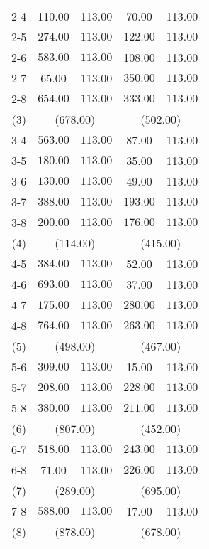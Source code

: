 \begin{table}[ht]
\begin{tabular*}{\textwidth}{@{\extracolsep{\fill} }ccccc}
  2-4 & 110.00 & 113.00 & 70.00 & 113.00 \\ 
  2-5 & \(\mathbf{274.00}\) & \(\mathbf{113.00}\) & \(\mathbf{122.00}\) & \(\mathbf{113.00}\) \\ 
  2-6 & \(\mathbf{583.00}\) & \(\mathbf{113.00}\) & 108.00 & 113.00 \\ 
  2-7 & 65.00 & 113.00 & \(\mathbf{350.00}\) & \(\mathbf{113.00}\) \\ 
  2-8 & \(\mathbf{654.00}\) & \(\mathbf{113.00}\) & \(\mathbf{333.00}\) & \(\mathbf{113.00}\) \\ 
   [1ex]
(3) & \multicolumn{2}{c}{(678.00)} & \multicolumn{2}{c}{(502.00)} \\   
   3-4 & \(\mathbf{563.00}\) & \(\mathbf{113.00}\) & 87.00 & 113.00 \\ 
  3-5 & \(\mathbf{180.00}\) & \(\mathbf{113.00}\) & 35.00 & 113.00 \\ 
  3-6 & \(\mathbf{130.00}\) & \(\mathbf{113.00}\) & 49.00 & 113.00 \\ 
  3-7 & \(\mathbf{388.00}\) & \(\mathbf{113.00}\) & \(\mathbf{193.00}\) & \(\mathbf{113.00}\) \\ 
  3-8 & \(\mathbf{200.00}\) & \(\mathbf{113.00}\) & \(\mathbf{176.00}\) & \(\mathbf{113.00}\) \\ 
   [1ex]
(4) & \multicolumn{2}{c}{(114.00)} & \multicolumn{2}{c}{(415.00)} \\   
   4-5 & \(\mathbf{384.00}\) & \(\mathbf{113.00}\) & 52.00 & 113.00 \\ 
  4-6 & \(\mathbf{693.00}\) & \(\mathbf{113.00}\) & 37.00 & 113.00 \\ 
  4-7 & \(\mathbf{175.00}\) & \(\mathbf{113.00}\) & \(\mathbf{280.00}\) & \(\mathbf{113.00}\) \\ 
  4-8 & \(\mathbf{764.00}\) & \(\mathbf{113.00}\) & \(\mathbf{263.00}\) & \(\mathbf{113.00}\) \\ 
   [1ex]
(5) & \multicolumn{2}{c}{(498.00)} & \multicolumn{2}{c}{(467.00)} \\   
   5-6 & \(\mathbf{309.00}\) & \(\mathbf{113.00}\) & 15.00 & 113.00 \\ 
  5-7 & \(\mathbf{208.00}\) & \(\mathbf{113.00}\) & \(\mathbf{228.00}\) & \(\mathbf{113.00}\) \\ 
  5-8 & \(\mathbf{380.00}\) & \(\mathbf{113.00}\) & \(\mathbf{211.00}\) & \(\mathbf{113.00}\) \\ 
   [1ex]
(6) & \multicolumn{2}{c}{(807.00)} & \multicolumn{2}{c}{(452.00)} \\    
   6-7 & \(\mathbf{518.00}\) & \(\mathbf{113.00}\) & \(\mathbf{243.00}\) & \(\mathbf{113.00}\) \\ 
  6-8 & 71.00 & 113.00 & \(\mathbf{226.00}\) & \(\mathbf{113.00}\) \\ 
   [1ex]
(7) & \multicolumn{2}{c}{(289.00)} & \multicolumn{2}{c}{(695.00)} \\   
   7-8 & \(\mathbf{588.00}\) & \(\mathbf{113.00}\) & 17.00 & 113.00 \\ 
   (8) & \multicolumn{2}{c}{(878.00)} & \multicolumn{2}{c}{(678.00)} \\
   \bottomrule
\end{tabular*}

\end{table}
